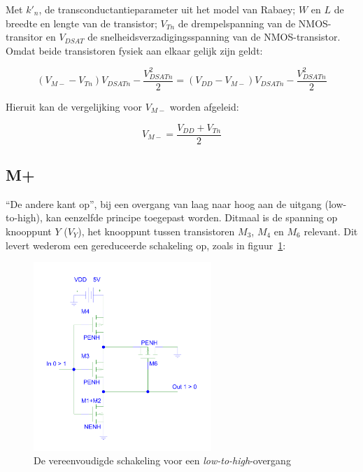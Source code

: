 \documentclass{scrartcl}  %
\begin{document}
Met $k'_{n}$, de transconductantieparameter uit het model van Rabaey; $W$ en $L$ de breedte en lengte van de transistor; $V_{Tn}$ de drempelspanning van de NMOS-transitor en $V_{DSAT}$ de snelheidsverzadigingsspanning van de NMOS-transistor.\\

Omdat beide transistoren fysiek aan elkaar gelijk zijn geldt:

$$(V_{M-}-V_{Tn})V_{DSATn} - \frac{V^{2}_{DSATn}}{2} = (V_{DD}-V_{M-})V_{DSATn} - \frac{V^{2}_{DSATn}}{2}$$

Hieruit kan de vergelijking voor $V_{M-}$ worden afgeleid:

\begin{equation} \label{eq:schmitt-mminus}
V_{M-} = \frac{V_{DD}+V_{Tn}}{2}
\end{equation}

\subsection{M+}
\label{subsec:trig-methode-mplus}
``De andere kant op'', bij een overgang van laag naar hoog aan de uitgang (low-to-high), kan eenzelfde principe toegepast worden. Ditmaal is de spanning op knooppunt $Y$ ($V_{Y}$), het knooppunt tussen transistoren $M_{3}$, $M_{4}$ en $M_{6}$ relevant. Dit levert wederom een gereduceerde schakeling op, zoals in figuur~\ref{fig:schmitt-schem-low-to-high}:

\begin{figure}[H]
\centering
	\includegraphics[width=0.6\textwidth]{resource/schmitt-low-to-high-rc.pdf}
	\caption{De vereenvoudigde schakeling voor een \textit{low-to-high}-overgang}
	\label{fig:schmitt-schem-low-to-high}
\end{figure}
\end{document}
